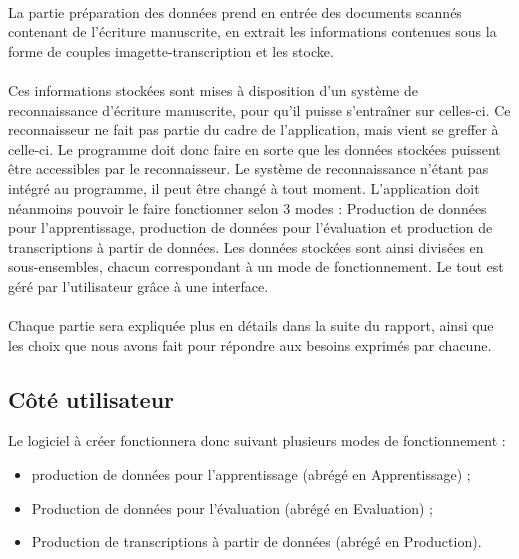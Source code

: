 \paragraph{}

La partie préparation des données prend en entrée des documents scannés contenant
de l’écriture manuscrite, en extrait les informations contenues sous la forme
de couples imagette-transcription et les stocke.

\paragraph{}
Ces informations stockées sont mises à disposition d’un système de reconnaissance d'écriture manuscrite, pour qu’il
puisse s'entraîner sur celles-ci. Ce reconnaisseur ne fait pas partie du cadre de
l’application, mais vient se greffer à celle-ci. Le programme doit donc faire
en sorte que les données stockées puissent être accessibles par le reconnaisseur.
Le système de reconnaissance n’étant pas intégré au programme, il peut être changé à tout
moment. L’application doit néanmoins pouvoir le faire fonctionner selon 3 modes :
Production de données pour l’apprentissage, production de données pour l’évaluation 
et production de transcriptions à partir de données. Les données stockées sont
ainsi divisées en sous-ensembles, chacun correspondant à un mode de
fonctionnement.
Le tout est géré par l’utilisateur grâce à une interface.

\paragraph{}
Chaque partie sera expliquée plus en détails dans la suite du rapport, ainsi que les choix que nous avons fait pour répondre aux besoins exprimés par chacune.

\subsection{Côté utilisateur}

Le logiciel à créer fonctionnera donc suivant plusieurs modes de fonctionnement :
\begin{itemize}
	\item production de données pour l’apprentissage (abrégé en Apprentissage) ;
	\item Production de données pour l’évaluation (abrégé en Evaluation) ;
	\item Production de transcriptions à partir de données (abrégé en Production).
\end{itemize}

